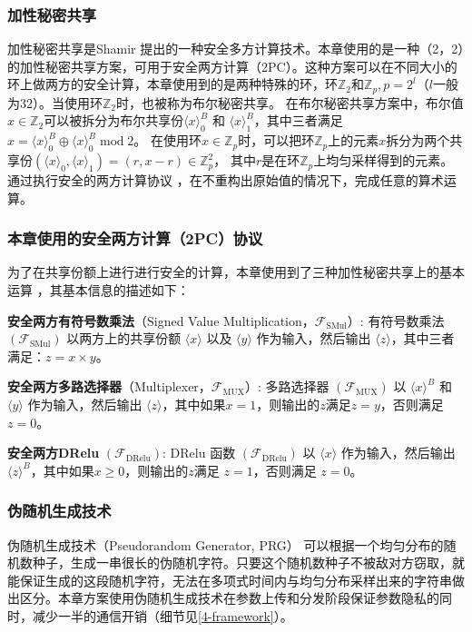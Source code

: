 \subsubsection{加性秘密共享}
加性秘密共享是Shamir \cite{shamir1979share} 提出的一种安全多方计算技术。本章使用的是一种（2，2）的加性秘密共享方案，可用于安全两方计算（2PC）。这种方案可以在不同大小的环上做两方的安全计算，本章使用到的是两种特殊的环，环$\mathbb{Z}_2$和$\mathbb{Z}_p, p=2^l$（$l$一般为32）。当使用环$\mathbb{Z}_2$时，也被称为布尔秘密共享。
在布尔秘密共享方案中，布尔值$x \in \mathbb{Z}_2$可以被拆分为布尔共享份$\langle x\rangle_0^B$ 和 $\langle x\rangle_1^B$，其中三者满足$x = \langle x\rangle_0^B \oplus \langle x\rangle_0^B\;\text{mod}\;2$。
在使用环$x \in \mathbb{Z}_p$时，可以把环$\mathbb{Z}_p$上的元素$x$拆分为两个共享份$(\langle x\rangle_0, \langle x\rangle_1) = (r, x -r) \in \mathbb{Z}_p^2$， 其中$r$是在环$\mathbb{Z}_p$上均匀采样得到的元素。通过执行安全的两方计算协议 \cite{rathee2020cryptflow2, rathee2021sirnn}，在不重构出原始值的情况下，完成任意的算术运算。

\subsubsection{本章使用的安全两方计算（2PC）协议}
为了在共享份额上进行进行安全的计算，本章使用到了三种加性秘密共享上的基本运算 \cite{rathee2021sirnn}，其基本信息的描述如下：
\begin{compactitem}
    \item \textbf{安全两方有符号数乘法}（Signed Value Multiplication，$\mathcal{F}_{\text{SMul}}$）: 有符号数乘法 $(\mathcal{F}_{\text{SMul}})$ 以两方上的共享份额 $\langle x\rangle$ 以及 $\langle y\rangle$ 作为输入，然后输出 $\langle z\rangle$，其中三者满足：$z = x \times y$。
    \item \textbf{安全两方多路选择器}（Multiplexer，$\mathcal{F}_{\text{MUX}}$）: 多路选择器 $(\mathcal{F}_{\text{MUX}})$ 以 $\langle x\rangle^B$ 和 $\langle y\rangle$ 作为输入，然后输出 $\langle z\rangle$，其中如果$x = 1$，则输出的$z$满足$z = y$，否则满足$z = 0$。 
    \item \textbf{安全两方DRelu} $(\mathcal{F}_{\text{DRelu}})$: DRelu 函数 $(\mathcal{F}_{\text{DRelu}})$ 以 $\langle x\rangle$ 作为输入，然后输出 $\langle z\rangle^B$，其中如果$x \geq 0$，则输出的$z$满足 $z = 1$，否则满足 $z = 0$。
\end{compactitem}

\subsubsection{伪随机生成技术}
伪随机生成技术（Pseudorandom Generator, PRG）\cite{yao1982theory} 可以根据一个均匀分布的随机数种子，生成一串很长的伪随机字符。只要这个随机数种子不被敌对方窃取，就能保证生成的这段随机字符，无法在多项式时间内与均匀分布采样出来的字符串做出区分。本章方案使用伪随机生成技术在参数上传和分发阶段保证参数隐私的同时，减少一半的通信开销（细节见\ref{4-framework}）。

